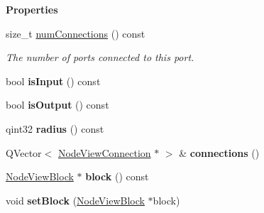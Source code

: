 \begin{Indent}\textbf{ Properties}\par
\begin{DoxyCompactItemize}
\item 
\mbox{\label{classrev_1_1_view_1_1_node_view_port_a486140b78b847b26ca0dda246e75eded}} 
size\+\_\+t \mbox{\hyperlink{classrev_1_1_view_1_1_node_view_port_a486140b78b847b26ca0dda246e75eded}{num\+Connections}} () const
\begin{DoxyCompactList}\small\item\em The number of ports connected to this port. \end{DoxyCompactList}\item 
\mbox{\label{classrev_1_1_view_1_1_node_view_port_a1d88fc732ada10c451a323bbfd6d2703}} 
bool {\bfseries is\+Input} () const
\item 
\mbox{\label{classrev_1_1_view_1_1_node_view_port_ace7e5e26c5713bfde5bc3fe09e67a088}} 
bool {\bfseries is\+Output} () const
\item 
\mbox{\label{classrev_1_1_view_1_1_node_view_port_aa5e415b9d334e540a3e85a026c4bf475}} 
qint32 {\bfseries radius} () const
\item 
\mbox{\label{classrev_1_1_view_1_1_node_view_port_a59b0910256495905c119837035b239a3}} 
Q\+Vector$<$ \mbox{\hyperlink{classrev_1_1_view_1_1_node_view_connection}{Node\+View\+Connection}} $\ast$ $>$ \& {\bfseries connections} ()
\item 
\mbox{\label{classrev_1_1_view_1_1_node_view_port_ae07c6699f0e96f95d1ee4f9a34ccd119}} 
\mbox{\hyperlink{classrev_1_1_view_1_1_node_view_block}{Node\+View\+Block}} $\ast$ {\bfseries block} () const
\item 
\mbox{\label{classrev_1_1_view_1_1_node_view_port_aa7d84114a0878856912eb4ee8eea2a61}} 
void {\bfseries set\+Block} (\mbox{\hyperlink{classrev_1_1_view_1_1_node_view_block}{Node\+View\+Block}} $\ast$block)
\item 
\mbox{\label{classrev_1_1_view_1_1_node_view_port_a244a4efe2b815ba1b473da1e150f76c3}} 

\end{DoxyCompactItemize}
\end{Indent}
